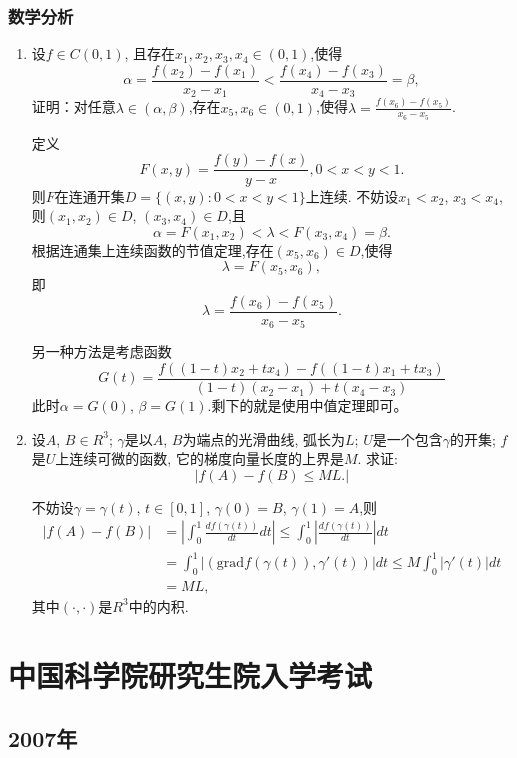 \documentclass[12pt,a4paper,openany]{book}
\begin{document}
\subsection{数学分析}
\begin{enumerate}
\item 设$f \in C(0, 1)$, 且存在$x_1, x_2, x_3, x_4 \in (0,1)$,使得
\[
\alpha = \frac{f(x_2) - f(x_1)}{x_2 - x_1} < \frac{f(x_4) - f(x_3)}{x_4 - x_3} = \beta,
\]
证明：对任意$\lambda \in (\alpha, \beta)$,存在$x_5, x_6 \in (0,1)$,使得$\lambda = \frac{f(x_6) - f(x_5)}{x_6 - x_5}$.

定义
\[
F(x, y) = \frac{f(y) - f(x)}{y - x}, 0 < x < y < 1.
\]
则$F$在连通开集$D=\{(x,y):0 < x < y < 1\}$上连续. 不妨设$x_1 < x_2$, $x_3 < x_4$,则$(x_1, x_2) \in D$, $(x_3, x_4) \in D$,且
\[
\alpha = F(x_1, x_2) < \lambda < F(x_3, x_4) = \beta.
\]
根据连通集上连续函数的节值定理,存在$(x_5, x_6) \in D$,使得
\[
\lambda = F(x_5, x_6),
\]
即
\[
\lambda = \frac{f(x_6) - f(x_5)}{x_6 - x_5}.
\]

另一种方法是考虑函数
\[
G(t) = \frac{f((1-t)x_2 + tx_4) - f((1-t)x_1 + tx_3)}{(1-t)(x_2 - x_1) + t(x_4 - x_3)}
\]
此时$\alpha = G(0)$, $\beta=G(1)$.剩下的就是使用中值定理即可。

\item 设$A$, $B \in R^3$; $\gamma$是以$A$, $B$为端点的光滑曲线, 弧长为$L$; $U$是一个包含$\gamma$的开集; $f$是$U$上连续可微的函数, 它的梯度向量长度的上界是$M$. 求证:
\[
|f(A) - f(B) \le ML.|
\]

不妨设$\gamma = \gamma(t)$, $t \in [0, 1]$, $\gamma(0) = B$, $\gamma(1)=A$,则
\[
\begin{aligned}
|f(A) - f(B)| &= |\int_0^1{\frac{df(\gamma(t))}{dt}dt}| \le \int_0^1{|\frac{df(\gamma(t))}{dt}|dt} \\
&=\int_0^1{|(\text{grad}{f(\gamma(t))}, \gamma'(t))|dt} \le M\int_0^1{|\gamma'(t)|dt} \\
&= ML,
\end{aligned}
\]
其中$(\cdot,\cdot)$是$R^3$中的内积.
\end{enumerate}

\chapter{中国科学院研究生院入学考试}
\section{2007年}
\end{document}
